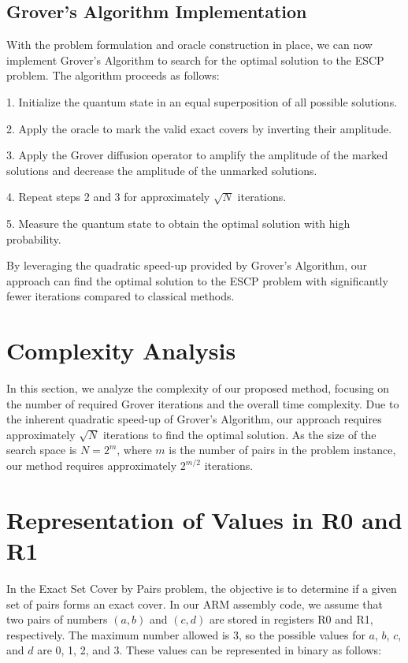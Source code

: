 \subsection{Grover's Algorithm Implementation}

With the problem formulation and oracle construction in place, we can now implement Grover's Algorithm to search for the optimal solution to the ESCP problem. The algorithm proceeds as follows:

1. Initialize the quantum state in an equal superposition of all possible solutions.

2. Apply the oracle to mark the valid exact covers by inverting their amplitude.

3. Apply the Grover diffusion operator to amplify the amplitude of the marked solutions and decrease the amplitude of the unmarked solutions.

4. Repeat steps 2 and 3 for approximately $\sqrt{N}$ iterations.

5. Measure the quantum state to obtain the optimal solution with high probability.

By leveraging the quadratic speed-up provided by Grover's Algorithm, our approach can find the optimal solution to the ESCP problem with significantly fewer iterations compared to classical methods.

\section{Complexity Analysis} \label{sec:complexity}

In this section, we analyze the complexity of our proposed method, focusing on the number of required Grover iterations and the overall time complexity. Due to the inherent quadratic speed-up of Grover's Algorithm, our approach requires approximately $\sqrt{N}$ iterations to find the optimal solution. As the size of the search space is $N = 2^m$, where $m$ is the number of pairs in the problem instance, our method requires approximately $2^{m/2}$ iterations.



\section{Representation of Values in R0 and R1}

In the Exact Set Cover by Pairs problem, the objective is to determine if a given set of pairs forms an exact cover. In our ARM assembly code, we assume that two pairs of numbers $(a, b)$ and $(c, d)$ are stored in registers R0 and R1, respectively. The maximum number allowed is 3, so the possible values for $a$, $b$, $c$, and $d$ are 0, 1, 2, and 3. These values can be represented in binary as follows:

